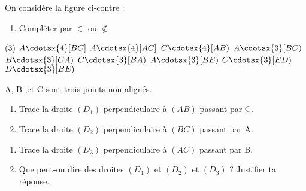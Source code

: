 \documentclass[a4paper,12pt]{article}
\begin{document}
\devoir[prv=true,ds=false,num=2 ,niv=1 , date=01/12/2022,Rdate=12/12/2022 ]

\begin{exo}
\begin{minipage}{.66\linewidth}
On considère la figure ci-contre :
\begin{enumerate}
\item  Compléter par $\in$ ou $\notin$
\end{enumerate}
\end{minipage}%
\begin{minipage}{.33\linewidth}
\end{minipage}

\begin{tasks}(3)
\task $A\cdotsx{4} [BC]$
\task $A\cdotsx{4} [AC]$%
\task $C\cdotsx{4} [AB)$ 
\task $A\cdotsx{3} [BC)$
\task $B\cdotsx{3} [CA)$
\task $C\cdotsx{3} [BA)$
\task $A\cdotsx{3} [BE)$
\task $C\cdotsx{3} [ED)$
\task $D\cdotsx{3} [BE)$
\end{tasks}
\end{exo}

\begin{exo}
\begin{minipage}{.7\linewidth}
A, B ,et C sont trois points non alignés.
\begin{enumerate}
\item Trace la droite $(D_{1})$ perpendiculaire à $(AB)$ passant par C.
\item Trace la droite $(D_{2})$ perpendiculaire à $(BC)$ passant par A.
\end{enumerate}
\end{minipage}%
\begin{minipage}{.3\linewidth}
\end{minipage}

\begin{enumerate}[start=3]
\item Trace la droite $(D_{3})$ perpendiculaire à $(AC)$ passant par B.
\item Que peut-on dire des droites $(D_{1})$ et $(D_{2})$ et $(D_{3})$ ? Justifier ta réponse.
\end{enumerate}



\end{exo}
\end{document}
